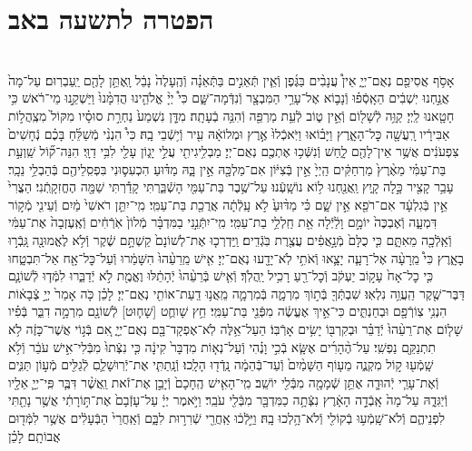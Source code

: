 \documentclass[twoside, openany, parskip=half, 11pt]{book}
\begin{document}
\begin{footnotesize}
\begin{multicols}{2}
\end{multicols}

\section*{הפטרה לתשעה באב}


\begin{multicols}{2}
 \\
אָסֹ֥ף אֲסִיפֵ֖ם נְאֻם־יְיָ֑ אֵין֩ עֲנָבִ֨ים בַּגֶּ֜פֶן וְֿאֵ֧ין תְּֿאֵנִ֣ים בַּתְּֿאֵנָ֗ה וְֿהֶֽעָלֶה֙ נָבֵ֔ל וָֽאֶתֵּ֥ן לָהֶ֖ם יַֽעַבְרֽוּם׃ עַל־מָה֙ אֲנַ֣חְנוּ יֽשְׁבִ֔ים הֵאָֽסְֿפ֗וּ וְֿנָב֛וֹא אֶל־עָרֵ֥י הַמִּבְצָ֖ר וְֿנִדְּֿמָה־שָּׁ֑ם כִּי֩ יְיָ֨ אֱלֹהֵ֤ינוּ הֲדִמָּ֨נוּ֙ וַיַּשְׁקֵ֣נוּ מֵי־רֹ֔אשׁ כִּ֥י חָטָ֖אנוּ לַֽיְיָ׃ קַוֵּ֥ה לְֿשָׁל֖וֹם וְֿאֵ֣ין ט֑וֹב לְֿעֵ֥ת מַרְפֵּ֖ה וְֿהִנֵּ֥ה בְֿעָתָֽה׃ מִדָּ֤ן נִשְׁמַע֙ נַחְרַ֣ת סוּסָ֗יו מִקּוֹל֙ מִצְֽהֲל֣וֹת אַבִּירָ֔יו רָֽעֲשָׁ֖ה כׇּל־הָאָ֑רֶץ וַיָּב֗וֹאוּ וַיֹּֽאכְֿלוּ֙ אֶ֣רֶץ וּמְלוֹאָ֔הּ עִ֖יר וְֿי֥שְֿׁבֵי בָֽהּ׃ כִּי֩ הִנְנִ֨י מְֿשַׁלֵּ֜חַ בָּכֶ֗ם נְֿחָשִׁים֙ צִפְעֹנִ֔ים אֲשֶׁ֥ר אֵין־לָהֶ֖ם לָ֑חַשׁ וְֿנִשְּֿׁכ֥וּ אֶתְכֶ֖ם נְאֻם־יְיָ׃ מַבְלִ֥יגִיתִ֖י עֲלֵ֣י יָג֑וֹן עָלַ֖י לִבִּ֥י דַוָּֽי׃ הִנֵּה־ק֞וֹל שַֽׁוְעַ֣ת בַּת־עַמִּ֗י מֵאֶ֨רֶץ֙ מַרְחַקִּ֔ים הַֽיְיָ֙ אֵ֣ין בְּֿצִיּ֔וֹן אִם־מַלְכָּ֖הּ אֵ֣ין בָּ֑הּ מַדּ֗וּעַ הִכְעִס֛וּנִי בִּפְסִֽלֵיהֶ֖ם בְּֿהַבְלֵ֥י נֵכָֽר׃ עָבַ֥ר קָצִ֖יר כָּ֣לָה קָ֑יִץ וַֽאֲנַ֖חְנוּ ל֥וֹא נוֹשָֽׁעְֿנוּ׃ עַל־שֶׁ֥בֶר בַּת־עַמִּ֖י הָשְֿׁבַּ֑רְתִּי קָדַ֕רְתִּי שַׁמָּ֖ה הֶחֱזִקָֽתְֿנִי׃ הַצֳרִי֙ אֵ֣ין בְּֿגִלְעָ֔ד אִם־רֹפֵ֖א אֵ֣ין שָׁ֑ם כִּ֗י מַדּ֨וּעַ֙ לֹ֣א עָֽלְֿתָ֔ה אֲרֻכַ֖ת בַּת־עַמִּֽי׃ מִֽי־יִתֵּ֤ן רֹאשִׁי֙ מַ֔יִם וְֿעֵינִ֖י מְֿק֣וֹר דִּמְעָ֑ה וְֿאֶבְכֶּה֙ יוֹמָ֣ם וָלַ֔יְֿלָה אֵ֖ת חַֽלְלֵ֥י בַת־עַמִּֽי׃ מִֽי־יִתְּֿנֵ֣נִי בַמִּדְבָּ֗ר מְֿלוֹן֙ אֹֽרְֿחִ֔ים וְֿאֶֽעֶזְבָה֙ אֶת־עַמִּ֔י וְֿאֵֽלְֿכָ֖ה מֵאִתָּ֑ם כִּ֤י כֻלָּם֙ מְֿנָ֣אֲפִ֔ים עֲצֶ֖רֶת בֹּֽגְֿדִֽים׃ וַֽיַּדְרְכ֤וּ אֶת־לְשׁוֹנָם֙ קַשְׁתָּ֣ם שֶׁ֔קֶר וְֿלֹ֥א לֶאֱמוּנָ֖ה גָּֽבְֿר֣וּ בָאָ֑רֶץ כִּי֩ מֵֽרָעָ֨ה אֶל־רָעָ֧ה יָצָ֛אוּ וְֿאֹתִ֥י לֹֽא־יָדָ֖עוּ נְאֻם־יְיָ׃ אִ֤ישׁ מֵֽרֵעֵ֨הוּ֙ הִשָּׁמֵ֔רוּ וְֿעַל־כׇּל־אָ֖ח אַל־תִּבְטָ֑חוּ כִּ֤י כׇל־אָח֙ עָק֣וֹב יַעְקֹ֔ב וְֿכׇל־רֵ֖עַ רָכִ֥יל יַֽהֲלֹֽךְ׃ וְֿאִ֤ישׁ בְּֿרֵעֵ֨הוּ֙ יְֿהָתֵ֔לּוּ וֶאֱמֶ֖ת לֹ֣א יְֿדַבֵּ֑רוּ לִמְּֿד֧וּ לְֿשׁוֹנָ֛ם דַּבֶּר־שֶׁ֖קֶר הַֽעֲוֵ֥ה נִלְאֽוּ׃ שִׁבְתְּֿךָ֖ בְּֿת֣וֹךְ מִרְמָ֑ה בְּֿמִרְמָ֛ה מֵֽאֲנ֥וּ דַֽעַת־אוֹתִ֖י נְאֻם־יְיָ׃ לָכֵ֗ן כֹּ֤ה אָמַר֙ יְיָ֣ צְֿבָא֔וֹת הִנְנִ֥י צֽוֹרְֿפָ֖ם וּבְחַנְתִּ֑ים כִּי־אֵ֣יךְ אֶעֱשֶׂ֔ה מִפְּֿנֵ֖י בַּת־עַמִּֽי׃ חֵ֥ץ שָׁוחֻ֛ט [שָׁח֛וּט] לְֿשׁוֹנָ֖ם מִרְמָ֣ה דִבֵּ֑ר בְּֿפִ֗יו שָׁל֤וֹם אֶת־רֵעֵ֨הוּ֙ יְֿדַבֵּ֗ר וּבְקִרְבּ֖וֹ יָשִׂ֥ים אָרְֿבּֽוֹ׃ הַעַל־אֵ֥לֶּה לֹֽא־אֶפְקָד־בָּ֖ם נְאֻם־יְיָ֑ אִ֚ם בְּֿג֣וֹי אֲשֶׁר־כָּזֶ֔ה לֹ֥א תִתְנַקֵּ֖ם נַפְשִֽׁי׃ עַל־הֶ֨הָרִ֜ים אֶשָּׂ֧א בְֿכִ֣י וָנֶ֗הִי וְֿעַל־נְא֤וֹת מִדְבָּר֙ קִינָ֔ה כִּ֤י נִצְּֿתוּ֙ מִבְּֿלִי־אִ֣ישׁ עֹבֵ֔ר וְֿלֹ֥א שָֽׁמְֿע֖וּ ק֣וֹל מִקְנֶ֑ה מֵע֤וֹף הַשָּׁמַ֨יִם֙ וְֿעַד־בְּֿהֵמָ֔ה נָֽדְֿד֖וּ הָלָֽכוּ׃ וְֿנָֽתַתִּ֧י אֶת־יְֿרֽוּשָׁלַ֛םִ לְֿגַלִּ֖ים מְֿע֣וֹן תַּנִּ֑ים וְֿאֶת־עָרֵ֧י יְֿהוּדָ֛ה אֶתֵּ֥ן שְֿׁמָמָ֖ה מִבְּֿלִ֖י יוֹשֵֽׁב׃ מִֽי־הָאִ֤ישׁ הֶֽחָכָם֙ וְֿיָבֵ֣ן אֶת־זֹ֔את וַֽאֲשֶׁ֨ר דִּבֶּ֧ר פִּֽי־יְיָ֛ אֵלָ֖יו וְֿיַגִּדָ֑הּ עַל־מָה֙ אָֽבְֿדָ֣ה הָאָ֔רֶץ נִצְּֿתָ֥ה כַמִּדְבָּ֖ר מִבְּֿלִ֖י עֹבֵֽר׃ וַיֹּ֣אמֶר יְיָ֔ עַל־עָזְֿבָם֙ אֶת־תּ֣וֹרָתִ֔י אֲשֶׁ֥ר נָתַ֖תִּי לִפְנֵיהֶ֑ם וְֿלֹא־שָֽׁמְֿע֥וּ בְֿקוֹלִ֖י וְֿלֹא־הָ֥לְכוּ בָֽהּ׃ וַיֵּ֣לְֿכ֔וּ אַֽחֲרֵ֖י שְֿׁרִר֣וּת לִבָּ֑ם וְֿאַֽחֲרֵי֙ הַבְּֿעָלִ֔ים אֲשֶׁ֥ר לִמְּֿד֖וּם אֲבוֹתָֽם׃ לָכֵ֗ן 
\end{multicols}
\end{footnotesize}
\end{document}
